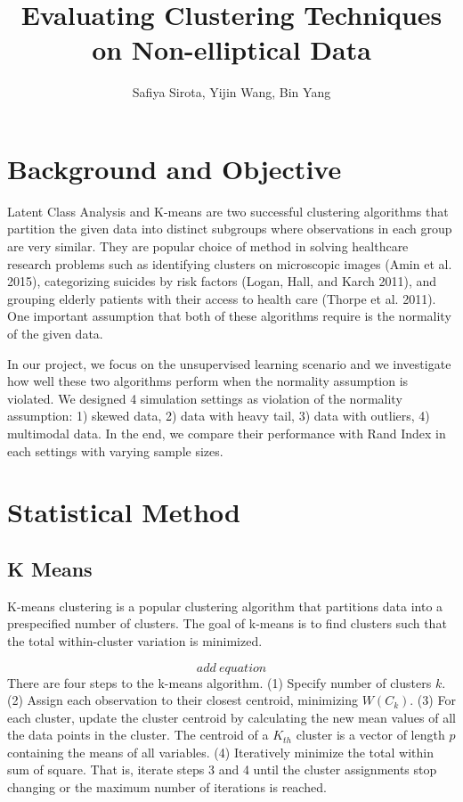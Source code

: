\documentclass[
]{article}
\title{Evaluating Clustering Techniques on Non-elliptical Data}
\author{Safiya Sirota, Yijin Wang, Bin Yang}
\date{}
\begin{document}
\maketitle

{
\setcounter{tocdepth}{2}
\tableofcontents
}
\hypertarget{background-and-objective}{%
\section{Background and Objective}\label{background-and-objective}}

Latent Class Analysis and K-means are two successful clustering
algorithms that partition the given data into distinct subgroups where
observations in each group are very similar. They are popular choice of
method in solving healthcare research problems such as identifying
clusters on microscopic images (Amin et al. 2015), categorizing suicides
by risk factors (Logan, Hall, and Karch 2011), and grouping elderly
patients with their access to health care (Thorpe et al. 2011). One
important assumption that both of these algorithms require is the
normality of the given data.

In our project, we focus on the unsupervised learning scenario and we
investigate how well these two algorithms perform when the normality
assumption is violated. We designed 4 simulation settings as violation
of the normality assumption: 1) skewed data, 2) data with heavy tail, 3)
data with outliers, 4) multimodal data. In the end, we compare their
performance with Rand Index in each settings with varying sample sizes.

\hypertarget{statistical-method}{%
\section{Statistical Method}\label{statistical-method}}

\hypertarget{k-means}{%
\subsection{K Means}\label{k-means}}

K-means clustering is a popular clustering algorithm that partitions
data into a prespecified number of clusters. The goal of k-means is to
find clusters such that the total within-cluster variation is minimized.

\[add\ equation\] There are four steps to the k-means algorithm. (1)
Specify number of clusters \(k\). (2) Assign each observation to their
closest centroid, minimizing \(W(C_k)\). (3) For each cluster, update
the cluster centroid by calculating the new mean values of all the data
points in the cluster. The centroid of a \(K_{th}\) cluster is a vector
of length \(p\) containing the means of all variables. (4) Iteratively
minimize the total within sum of square. That is, iterate steps 3 and 4
until the cluster assignments stop changing or the maximum number of
iterations is reached.
\end{document}
